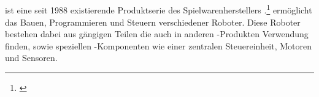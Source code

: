 \newpage
\subsection{\LM}
\color{finishing}
\LM{} ist eine seit 1988 existierende Produktserie des Spielwarenherstellers \LE{}.\footnote{\citep[vgl.][Das EV3 Roboter Universum, Seite 21]{Scholz.DasEV3}\label{note23}}
\LM{} ermöglicht das Bauen, Programmieren und Steuern verschiedener \LE{} Roboter. Diese Roboter bestehen dabei aus
gängigen \LE{} Teilen die auch in anderen \LE{}-Produkten Verwendung finden, sowie speziellen \LE{}-Komponenten 
wie einer zentralen Steuereinheit, Motoren und Sensoren.
